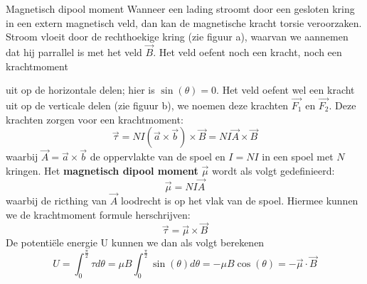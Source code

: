 \begin{theo}{Magnetisch dipool moment}
    Wanneer een lading stroomt door een gesloten kring in een extern magnetisch veld, dan kan de magnetische kracht torsie veroorzaken.
    Stroom vloeit door de rechthoekige kring (zie figuur a), waarvan we aannemen dat hij parrallel is met het veld $\Vec{B}$.
    Het veld oefent noch een kracht, noch een krachtmoment 

    \vspace{-0.3cm}
    \hspace{-0.5cm}\begin{minipage}{0.79\textwidth}
        uit op de horizontale delen; hier is $\sin(\theta) = 0$. Het veld oefent wel een kracht uit op de verticale delen
        (zie figuur b), we noemen deze krachten $\Vec{F_1}$ en $\Vec{F_2}$. Deze krachten zorgen voor een krachtmoment:
        \begin{equation*}
            \Vec{\tau} = NI(\Vec{a} \times \Vec{b}) \times \Vec{B} = NI\Vec{A} \times \Vec{B}
        \end{equation*}
        waarbij $\Vec{A} = \Vec{a} \times \Vec{b}$ de oppervlakte van de spoel en $I = NI$ in een spoel met $N$ kringen.
        Het \textbf{magnetisch dipool moment} $\Vec{\mu}$ wordt als volgt gedefinieerd:
        \begin{equation*}
            \Vec{\mu} = NI\Vec{A}
        \end{equation*}
        waarbij de ricthing van $\Vec{A}$ loodrecht is op het vlak van de spoel. Hiermee kunnen we de krachtmoment formule herschrijven:
        \begin{equation*}
            \Vec{\tau} = \Vec{\mu} \times \Vec{B}
        \end{equation*}
        De potentiële energie U kunnen we dan als volgt berekenen
        \begin{equation*}
            U = \int_0^{\tfrac{\pi}{2}} \tau d\theta = \mu B \int_0^{\tfrac{\pi}{2}} \sin(\theta) d\theta = -\mu B\cos(\theta) = -\Vec{\mu} \cdot \Vec{B}
        \end{equation*}
        

\end{minipage}
\end{theo}
